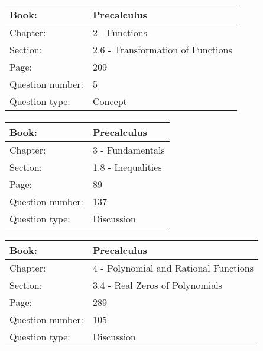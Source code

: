 \documentclass{article}
\begin{document}
   \paragraph{}
   \begin{tabularx}{1\textwidth}{
           p{}
           p{}
       }
       \toprule
       Book: & Precalculus
       \\
       \midrule
       Chapter: & 2 - Functions
       \\
       \midrule
       Section: & 2.6 - Transformation of Functions
       \\
       \midrule
       Page: & 209
       \\
       \midrule
       Question number: & 5
       \\
       \midrule
       Question type: & Concept
       \\
       \bottomrule
   \end{tabularx}



   \paragraph{}
   \begin{tabularx}{1\textwidth}{
           p{}
           p{}
       }
       \toprule
       Book: & Precalculus
       \\
       \midrule
       Chapter: & 3 - Fundamentals
       \\
       \midrule
       Section: & 1.8 - Inequalities
       \\
       \midrule
       Page: & 89
       \\
       \midrule
       Question number: & 137
       \\
       \midrule
       Question type: & Discussion
       \\
       \bottomrule
   \end{tabularx}



   \paragraph{}
   \begin{tabularx}{1\textwidth}{
           p{}
           p{}
       }
       \toprule
       Book: & Precalculus
       \\
       \midrule
       Chapter: & 4 - Polynomial and Rational Functions
       \\
       \midrule
       Section: & 3.4 - Real Zeros of Polynomials
       \\
       \midrule
       Page: & 289
       \\
       \midrule
       Question number: & 105
       \\
       \midrule
       Question type: & Discussion
       \\
       \bottomrule
   \end{tabularx}
\end{document}
